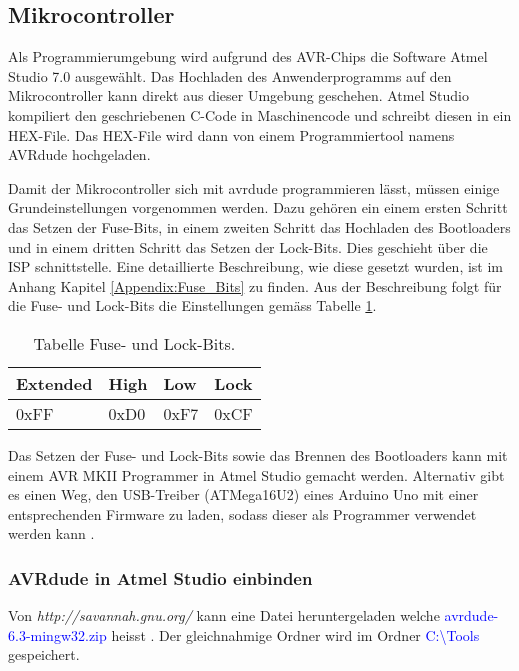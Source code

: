 \subsection{Mikrocontroller}
\label{subsec:Inbetriebnahme_Mikrocontroller}

Als Programmierumgebung wird aufgrund des AVR-Chips die Software Atmel Studio 7.0 ausgewählt. Das Hochladen des Anwenderprogramms auf den Mikrocontroller kann direkt aus dieser Umgebung geschehen. 
Atmel Studio kompiliert den geschriebenen C-Code in Maschinencode und schreibt diesen in ein HEX-File. Das HEX-File wird dann von einem Programmiertool namens AVRdude hochgeladen.\cite{verschiedene_autoren_avrdude_2019}

Damit der Mikrocontroller sich mit avrdude programmieren lässt, müssen einige Grundeinstellungen vorgenommen werden. Dazu gehören ein einem ersten Schritt das Setzen der Fuse-Bits, in einem zweiten Schritt das Hochladen des Bootloaders und in einem dritten Schritt das Setzen der Lock-Bits. Dies geschieht über die ISP schnittstelle. Eine detaillierte Beschreibung, wie diese gesetzt wurden, ist im Anhang Kapitel \ref{Appendix:Fuse_Bits} zu finden. Aus der Beschreibung folgt für die Fuse- und Lock-Bits die Einstellungen gemäss Tabelle \ref{tab:Fuse_und_Lock-Bits}.

\begin{table}[h!]
\center
\begin{tabular}{|l|l|l|l|}
\hline
\textbf{Extended} & \textbf{High} & \textbf{Low} & \textbf{Lock}\\
\hline
0xFF & 0xD0 & 0xF7 & 0xCF\\
\hline
\end{tabular}
\caption{Tabelle Fuse- und Lock-Bits.}
\label{tab:Fuse_und_Lock-Bits}
\end{table}

Das Setzen der Fuse- und Lock-Bits sowie das Brennen des Bootloaders kann mit einem AVR MKII Programmer in Atmel Studio gemacht werden. Alternativ gibt es einen Weg, den USB-Treiber (ATMega16U2) eines Arduino Uno mit einer entsprechenden Firmware zu laden, sodass dieser als Programmer verwendet werden kann  \cite{vidmofollow_turn_2017}.

\subsubsection{AVRdude in Atmel Studio einbinden}\label{subsubsec:avrdude_in_atmelstudio_einbinden}

Von \textit{http://savannah.gnu.org/} kann eine Datei heruntergeladen welche \textcolor{blue}{avrdude-6.3-mingw32.zip} heisst \cite{savannahgnuorg_index_2016}. Der gleichnahmige Ordner wird im Ordner \textcolor{blue}{C:\textbackslash Tools} gespeichert. 

